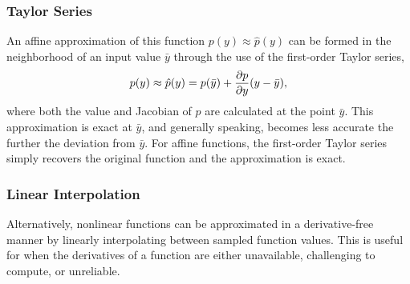 \subsubsection{Taylor Series}
An affine approximation of this function ${p}(y) \approx \hat{p}(y)$ can be formed in the neighborhood of an input value $\bar{y}$ through the use of the first-order Taylor series,
%
\begin{align}
    p(y) \approx \hat{p}(y) = p(\bar{y}) + \frac{\partial { p }}{ \partial { y }} (y - \bar{y}),
\end{align}
%
where both the value and Jacobian of $p$ are calculated at the point $\bar{y}$. This approximation is exact at $\bar{y}$, and generally speaking, becomes less accurate the further the deviation from $\bar{y}$. For affine functions, the first-order Taylor series simply recovers the original function and the approximation is exact.

%
\subsubsection{Linear Interpolation}
%
Alternatively, nonlinear functions can be approximated in a derivative-free manner by linearly interpolating between sampled function values. This is useful for when the derivatives of a function are either unavailable, challenging to compute, or unreliable.
% 


